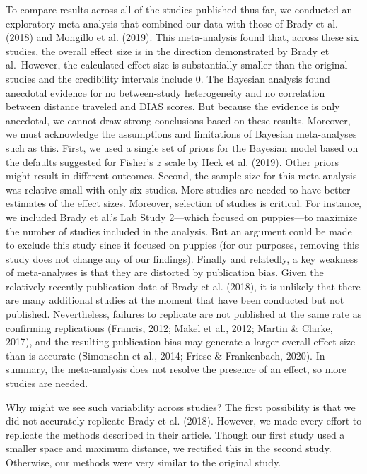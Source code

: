 \documentclass[
  pub,floatsintext]{apa6}
\begin{document}
To compare results across all of the studies published thus far, we conducted an exploratory meta-analysis that combined our data with those of Brady et al. (2018) and Mongillo et al. (2019). This meta-analysis found that, across these six studies, the overall effect size is in the direction demonstrated by Brady et al.~However, the calculated effect size is substantially smaller than the original studies and the credibility intervals include 0. The Bayesian analysis found anecdotal evidence for no between-study heterogeneity and no correlation between distance traveled and DIAS scores. But because the evidence is only anecdotal, we cannot draw strong conclusions based on these results. Moreover, we must acknowledge the assumptions and limitations of Bayesian meta-analyses such as this. First, we used a single set of priors for the Bayesian model based on the defaults suggested for Fisher's \(z\) scale by Heck et al. (2019). Other priors might result in different outcomes. Second, the sample size for this meta-analysis was relative small with only six studies. More studies are needed to have better estimates of the effect sizes. Moreover, selection of studies is critical. For instance, we included Brady et al.'s Lab Study 2---which focused on puppies---to maximize the number of studies included in the analysis. But an argument could be made to exclude this study since it focused on puppies (for our purposes, removing this study does not change any of our findings). Finally and relatedly, a key weakness of meta-analyses is that they are distorted by publication bias. Given the relatively recently publication date of Brady et al. (2018), it is unlikely that there are many additional studies at the moment that have been conducted but not published. Nevertheless, failures to replicate are not published at the same rate as confirming replications (Francis, 2012; Makel et al., 2012; Martin \& Clarke, 2017), and the resulting publication bias may generate a larger overall effect size than is accurate (Simonsohn et al., 2014; Friese \& Frankenbach, 2020). In summary, the meta-analysis does not resolve the presence of an effect, so more studies are needed.

Why might we see such variability across studies? The first possibility is that we did not accurately replicate Brady et al. (2018). However, we made every effort to replicate the methods described in their article. Though our first study used a smaller space and maximum distance, we rectified this in the second study. Otherwise, our methods were very similar to the original study.
\end{document}
